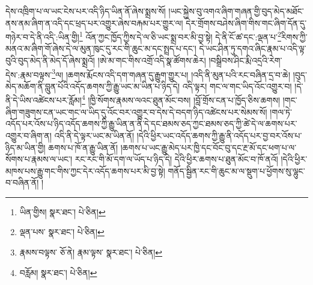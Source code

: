 དེས་འཁྲིག་པ་ལ་ཡང་ངེས་པར་འདི་ཉིད་ཡིན་ནོ་ཞེས་སྨྲས་སོ། །ཡང་སྐྱེས་བུ་འགའ་ཞིག་གཞན་གྱི་བུད་མེད་མཐོང་ནས་ནམ་ཞིག་ན་འདི་དང་ཕྲད་པར་འགྱུར་ཞེས་བརྐམ་པར་གྱུར་ལ། དེར་གྲོགས་བཤེས་ཞིག་གིས་གང་ཞིག་དོན་དུ་གཉེར་བ་དེ་ནི་འདི་:ཡིན་གྱི།\footnote{ཡིན་གྱིས།  སྣར་ཐང་།  པེ་ཅིན། } འོན་ཀྱང་ཁྱོད་ཀྱིས་དེ་ལ་ཅི་ཡང་སྨྲ་བར་མི་བྱ་སྟེ། དེ་ནི་ངོ་ཚ་དང་:ལྡན་པ་\footnote{ལྡན་པས་  སྣར་ཐང་།  པེ་ཅིན། }རིགས་ཀྱི་མནའ་མ་ཞིག་གོ་ཞེས་དེ་ལ་མུན་ཁུང་དུ་རང་གི་ཆུང་མ་དང་སྤྲད་པ་དང་། དེ་ཡང་ཤིན་ཏུ་དགའ་ཞིང་རྣམ་པ་འདི་ལྟ་བུའི་བུད་མེད་ནི་མེད་དོ་ཞེས་སྨྲའོ། །ཨེ་མ་གང་གིས་འགྲོ་འདི་སྣ་ཚོགས་ཆེར། །བསྒྲིབས་ཤིང་རྨི་འདྲའི་རེག་དེས་:རྣམ་བལྟས་\footnote{རྣམས་བལྟས་  ཅོ་ནེ། རྣམ་ལྟས་  སྣར་ཐང་།  པེ་ཅིན། }ལ། །ཆགས་རྨོངས་འདི་དག་གཞན་དུ་རྒྱུག་གྱུར་པ། །འདི་ནི་མུན་པའི་རང་བཞིན་དྲ་བ་ཆེ། །བུད་མེད་མཆོག་ནི་བླུན་པོའི་འདོད་ཆགས་ཀྱི་རྒྱུ་ཡང་མ་ཡིན་པ་ཉིད་དེ། འདི་ལྟར། གང་ལ་གང་ཡིད་འོང་འགྱུར་བ། །དེ་ནི་དེ་ཡིས་འཚེངས་པར་རློམ།\footnote{བརློམ།  སྣར་ཐང་།  པེ་ཅིན། } །ཁྱི་སོགས་རྣམས་ལའང་ཐུན་མོང་བས། །བློ་གྲོས་ངན་པ་ཁྱོད་ཅིས་ཆགས། །གང་ཞིག་གཟུགས་ངན་ཡང་གང་ལ་ཡིད་དུ་འོང་བར་འགྱུར་བ་དེས་དེ་བདག་ཉིད་འཚེངས་པར་སེམས་སོ། །གལ་ཏེ་འདོད་པར་འོས་པ་ཉིད་འདོད་ཆགས་ཀྱི་རྒྱུ་ཡིན་ན་ནི་དེ་དང་ཐམས་ཅད་ཀྱང་ཐམས་ཅད་ཀྱི་ཚེ་དེ་ལ་ཆགས་པར་འགྱུར་བ་ཞིག་ན། འདི་ནི་དེ་ལྟར་ཡང་མ་ཡིན་ནོ། །དེའི་ཕྱིར་ཡང་འདོད་ཆགས་ཀྱི་རྒྱུ་ནི་འདོད་པར་བྱ་བར་འོས་པ་ཉིད་མ་ཡིན་གྱི། ཆགས་པ་ཁོ་ན་རྒྱུ་ཡིན་ནོ། །ཆགས་པ་ཡང་རྒྱུ་མེད་པར་ཁྱི་དང་བོང་བུ་དང་རྔ་མོ་དང་ཕག་པ་ལ་སོགས་པ་རྣམས་ལ་ཡང་། རང་རང་གི་མོ་དག་ལ་ཡོད་པ་ཉིད་དེ། དེའི་ཕྱིར་ཆགས་པ་ཐུན་མོང་བ་ཁོ་ནའོ། །དེའི་ཕྱིར་མཁས་པས་རྒྱུ་གང་གིས་ཀྱང་དེར་འདོད་ཆགས་པར་མི་བྱ་སྟེ། གནོད་སྦྱིན་རང་གི་ཆུང་མ་ལ་སྡུག་པ་ཕྱོགས་སུ་ལྷུང་བ་བཞིན་ནོ། །
